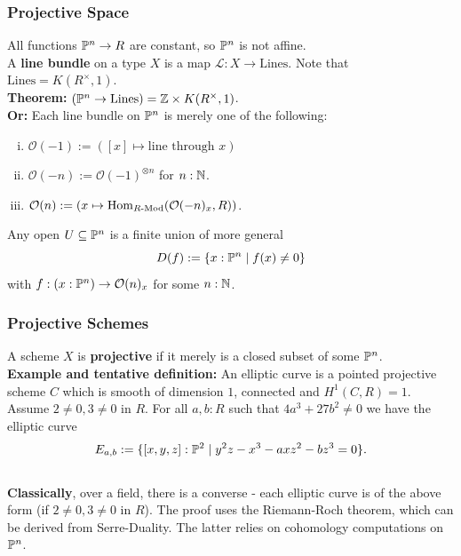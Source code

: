 \documentclass{beamer}
\begin{document}
\begin{frame}
  \frametitle{Projective Space}
  All functions $\mathbb{P}^n\to R$ are constant, so $\mathbb{P}^n$ is not affine. \\
  \vspace{4mm}
  \pause
  A \textbf{line bundle} on a type $X$ is a map $\mathcal L:X\to \mathrm{Lines}$.
  Note that $\mathrm{Lines}=K(R^\times,1)$.\\
  \vspace{4mm}
  \pause
  \textbf{Theorem:} $(\mathbb{P}^n\to \mathrm{Lines}) = \mathbb{Z}\times K(R^\times,1)$. \\
  \textbf{Or:} Each line bundle on $\mathbb{P}^n$ is merely one of the following:
  \begin{enumerate}[(i)]
  \item $\mathcal O(-1):=([x] \mapsto \text{line through $x$})$
  \item $\mathcal O(-n):=\mathcal O(-1)^{\otimes n}$ for $n:\mathbb{N}$.
  \item $\mathcal O(n):=(x\mapsto \mathrm{Hom}_{R\text{-}\mathrm{Mod}}(\mathcal O(-n)_x,R))$.
  \end{enumerate}
  \vspace{4mm}
  \pause
  Any open $U\subseteq \mathbb{P}^n$ is a finite union of more general
  \[ D(f):=\{x:\mathbb{P}^n\mid f(x)\neq 0 \}\]
  with $f:(x:\mathbb{P}^n)\to \mathcal O(n)_x$ for some $n:\mathbb{N}$.
\end{frame}

\begin{frame}
  \frametitle{Projective Schemes}
  \pause
  A scheme $X$ is \textbf{projective} if it merely is a closed subset of some $\mathbb{P}^n$. \\
  \vspace{4mm}
  \textbf{Example and tentative definition:}
  An elliptic curve is a pointed projective scheme $C$
  which is smooth of dimension $1$, connected and $H^1(C,R)=1$.
  \pause
  Assume $2\neq 0,3\neq 0$ in $R$.
  For all $a,b:R$ such that $4a^3+27b^2\neq 0$ we have the elliptic curve
  \[ E_{a,b}:=\{ [x,y,z] :\mathbb{P}^2\mid y^2z-x^3-axz^2-bz^3=0 \}.\] \\
  \pause
  \textbf{Classically}, over a field, there is a converse - each elliptic curve is of the above form (if $2\neq 0, 3\neq 0$ in $R$).
  \pause
  The proof uses the Riemann-Roch theorem, which can be derived from Serre-Duality.
  The latter relies on cohomology computations on $\mathbb{P}^n$.
\end{frame}
\end{document}
